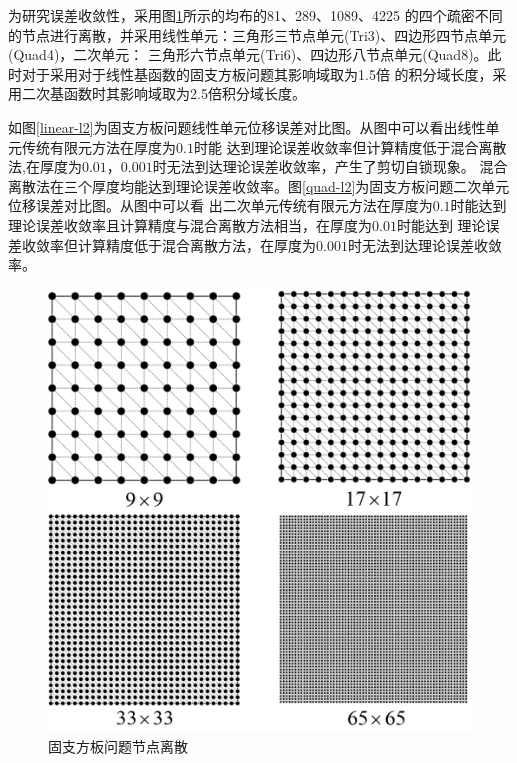为研究误差收敛性，采用图\ref{platemsh}所示的均布的81、289、1089、4225
的四个疏密不同的节点进行离散，并采用线性单元：三角形三节点单元(Tri3)、四边形四节点单元(Quad4)，二次单元：
三角形六节点单元(Tri6)、四边形八节点单元(Quad8)。此时对于采用对于线性基函数的固支方板问题其影响域取为1.5倍
的积分域长度，采用二次基函数时其影响域取为2.5倍积分域长度。

如图\ref{linear-l2}为固支方板问题线性单元位移误差对比图。从图中可以看出线性单元传统有限元方法在厚度为$0.1$时能
达到理论误差收敛率但计算精度低于混合离散法,在厚度为$0.01$，$0.001$时无法到达理论误差收敛率，产生了剪切自锁现象。
混合离散法在三个厚度均能达到理论误差收敛率。图\ref{quad-l2}为固支方板问题二次单元位移误差对比图。从图中可以看
出二次单元传统有限元方法在厚度为$0.1$时能达到理论误差收敛率且计算精度与混合离散方法相当，在厚度为$0.01$时能达到
理论误差收敛率但计算精度低于混合离散方法，在厚度为$0.001$时无法到达理论误差收敛率。
\begin{figure}[H]
    \centering 
    \includegraphics[scale=0.5]{figures/shearlocking/platemsh.png}
    \caption{固支方板问题节点离散}\label{platemsh}
\end{figure}
